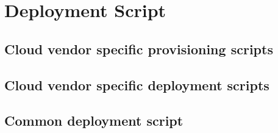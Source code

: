  
\chapter[Deployment Script]{Deployment Script}




\section{Cloud vendor specific provisioning scripts}










\section{Cloud vendor specific deployment scripts}














\section{Common deployment script}

